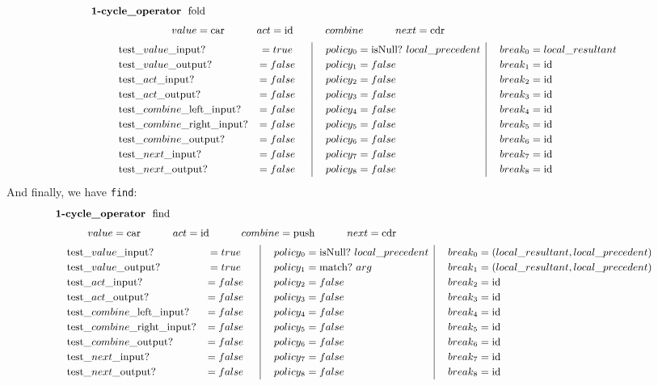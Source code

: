 \documentclass[twoside]{article}
\newcommand{\bfmbox}[1]{\mbox{\bfseries #1}}
\newcommand{\test}[1][\_]{\mbox{test#1}}
\newcommand{\vi}[1][\_]{\mbox{$value$#1input}}
\newcommand{\vo}[1][\_]{\mbox{$value$#1output}}
\newcommand{\ai}[1][\_]{\mbox{$act$#1input}}
\newcommand{\ao}[1][\_]{\mbox{$act$#1output}}
\newcommand{\cli}[1][\_]{\mbox{$combine$#1left#1input}}
\newcommand{\cri}[1][\_]{\mbox{$combine$#1right#1input}}
\newcommand{\co}[1][\_]{\mbox{$combine$#1output}}
\newcommand{\nei}[1][\_]{\mbox{$next$#1input}}
\newcommand{\no}[1][\_]{\mbox{$next$#1output}}
\newcommand{\locr}[1][\_]{local#1resultant}
\newcommand{\locp}[1][\_]{local#1precedent}
\newcommand{\tab}[1][1.125cm]{\hspace{#1}}
\newcommand{\col}[1][0ex]{& \hspace{#1}}
\newcommand{\id}{\mbox{id}}
\newcommand{\car}{\mbox{car}}
\newcommand{\cdr}{\mbox{cdr}}
\newcommand{\isNull}{\mbox{isNull?}}
\newcommand{\push}{\mbox{push}}
\begin{document}
$$ \def\arraystretch{1.2}
\small
\tab[0.5cm] \begin{array}{llcl|l|l}
\multicolumn{5}{l}{\tab[-0.5cm] \bfmbox{1-cycle\_operator}\ \ \mbox{fold}}							\\[1ex]
\multicolumn{5}{l}{\tab[2cm] value = \car \tab[1cm] act = \id \tab[1cm] combine \tab[1cm] next = \cdr}				\\[1ex]
	& \test\vi?	& = true	&\col[0.25cm] policy_{0} = \isNull\ \locp	\col[0.25cm] break_{0} = \locr		\\
	& \test\vo?	& = false	&\col[0.25cm] policy_{1} = false			\col[0.25cm] break_{1} = \id	\\
	& \test\ai?	& = false	&\col[0.25cm] policy_{2} = false			\col[0.25cm] break_{2} = \id	\\
	& \test\ao?	& = false	&\col[0.25cm] policy_{3} = false			\col[0.25cm] break_{3} = \id	\\
	& \test\cli?	& = false	&\col[0.25cm] policy_{4} = false			\col[0.25cm] break_{4} = \id	\\
	& \test\cri?	& = false	&\col[0.25cm] policy_{5} = false			\col[0.25cm] break_{5} = \id	\\
	& \test\co? 	& = false	&\col[0.25cm] policy_{6} = false			\col[0.25cm] break_{6} = \id	\\
	& \test\nei?	& = false	&\col[0.25cm] policy_{7} = false			\col[0.25cm] break_{7} = \id	\\
	& \test\no? 	& = false	&\col[0.25cm] policy_{8} = false			\col[0.25cm] break_{8} = \id
\end{array} $$
And finally, we have \texttt{find}:
$$ \def\arraystretch{1.2}
\small
\tab[0cm] \begin{array}{llcl|l|l}
\multicolumn{5}{l}{\tab[0cm] \bfmbox{1-cycle\_operator}\ \ \mbox{find}}								\\[1ex]
\multicolumn{5}{l}{\tab[1cm] value = \car \tab[1cm] act = \id \tab[1cm] combine = \push \tab[1cm] next = \cdr}			\\[1ex]
	& \test\vi?	& = true	&\col[0.25cm] policy_{0} = \isNull\ \locp	\col[0.25cm] break_{0} = (\locr, \locp)	\\
	& \test\vo?	& = true	&\col[0.25cm] policy_{1} = \mbox{match?}\ arg	\col[0.25cm] break_{1} = (\locr, \locp)	\\
	& \test\ai?	& = false	&\col[0.25cm] policy_{2} = false		\col[0.25cm] break_{2} = \id		\\
	& \test\ao?	& = false	&\col[0.25cm] policy_{3} = false		\col[0.25cm] break_{3} = \id		\\
	& \test\cli?	& = false	&\col[0.25cm] policy_{4} = false		\col[0.25cm] break_{4} = \id		\\
	& \test\cri?	& = false	&\col[0.25cm] policy_{5} = false		\col[0.25cm] break_{5} = \id		\\
	& \test\co? 	& = false	&\col[0.25cm] policy_{6} = false		\col[0.25cm] break_{6} = \id		\\
	& \test\nei?	& = false	&\col[0.25cm] policy_{7} = false		\col[0.25cm] break_{7} = \id		\\
	& \test\no? 	& = false	&\col[0.25cm] policy_{8} = false		\col[0.25cm] break_{8} = \id
\end{array} $$
\end{document}
